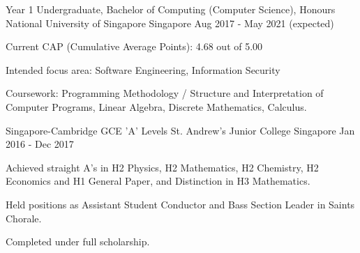 

\begin{cventries}

  \cventry
    {Year 1 Undergraduate, Bachelor of Computing (Computer Science), Honours} %
    {National University of Singapore} %
    {Singapore} %
    {Aug 2017 - May 2021 (expected)} %
    {
      \begin{cvitems} %
        \item {Current CAP (Cumulative Average Points): 4.68 out of 5.00}
        \item {Intended focus area: Software Engineering, Information Security}
        \item {Coursework: Programming Methodology / Structure and Interpretation of Computer Programs, Linear Algebra, Discrete Mathematics, Calculus.}
      \end{cvitems}
    }
    
	\cventry
	{Singapore-Cambridge GCE 'A' Levels} %
	{St. Andrew's Junior College} %
	{Singapore} %
	{Jan 2016 - Dec 2017} %
	{
		\begin{cvitems} %
			\item {Achieved straight A's in H2 Physics, H2 Mathematics, H2 Chemistry, H2 Economics and H1 General Paper, and Distinction in H3 Mathematics.}
			\item {Held positions as Assistant Student Conductor and Bass Section Leader in Saints Chorale.}
			\item {Completed under full scholarship.}
		\end{cvitems}
	}
    


\end{cventries}
